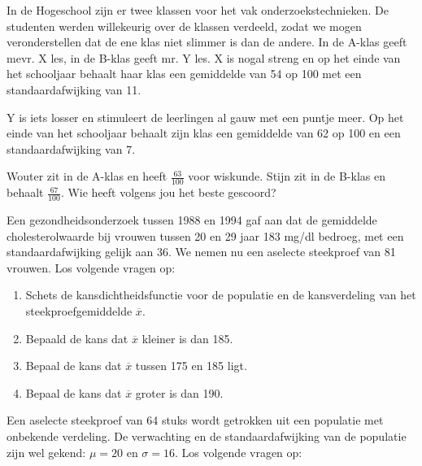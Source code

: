 {%

\begin{exercise}
  In de  Hogeschool zijn er twee klassen voor het vak onderzoekstechnieken. De studenten werden willekeurig over de klassen verdeeld, zodat we mogen veronderstellen dat de ene klas niet slimmer is dan de andere. In de A-klas geeft mevr. X les, in de B-klas geeft mr. Y les. X is nogal streng en op het einde van het schooljaar behaalt haar klas een gemiddelde van 54 op 100 met een standaardafwijking van 11.

  Y is iets losser en stimuleert de leerlingen al gauw met een puntje meer. Op het einde van het schooljaar behaalt zijn klas een gemiddelde van 62 op 100 en een standaardafwijking van 7.

  Wouter zit in de A-klas en heeft $\frac{63}{100}$ voor wiskunde. Stijn zit in de B-klas en behaalt $\frac{67}{100}$. Wie heeft volgens jou het beste gescoord?
\end{exercise}

\begin{exercise}
  Een gezondheidsonderzoek tussen 1988 en 1994 gaf aan dat de gemiddelde cholesterolwaarde bij vrouwen tussen 20 en 29 jaar 183 mg/dl bedroeg, met een standaardafwijking gelijk aan 36. We nemen nu een aselecte steekproef van 81 vrouwen. Los volgende vragen op:

  \begin{enumerate}[label=\alph*.]
    \item Schets de kansdichtheidsfunctie voor de populatie en de kansverdeling van het steekproefgemiddelde $\overline{x}$.
    \item Bepaald de kans dat $\overline{x}$ kleiner is dan 185.
    \item Bepaal de kans dat $\overline{x}$ tussen 175 en 185 ligt.
    \item Bepaal de kans dat $\overline{x}$ groter is dan 190.
  \end{enumerate}
\end{exercise}

\begin{exercise}
  Een aselecte steekproef van 64 stuks wordt getrokken uit een populatie met onbekende verdeling. De verwachting en de standaardafwijking van de populatie
  zijn wel gekend: $\mu = 20$ en $\sigma=16$. Los volgende vragen op:


\end{exercise}}
